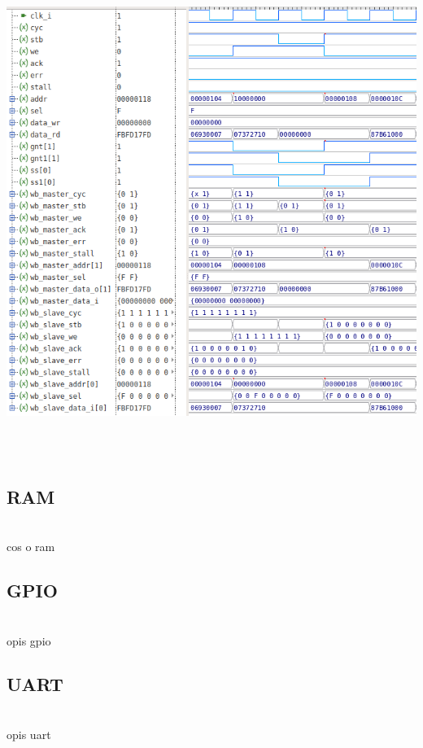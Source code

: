 \documentclass[11pt,a4paper]{article}
\begin{document}
			\begin{minipage}{\textwidth}
				\nopagebreak
				\begin{center}
					\includegraphics[height=16cm,width=14cm,keepaspectratio]{./rysunki/wishbone_timing.png}
				\end{center}
			\end{minipage} 
	\subsection{RAM}
	\hspace{5mm}
		\\cos o ram

	\subsection{GPIO}
	\hspace{5mm}
		\\opis gpio

	\subsection{UART}
	\hspace{5mm}
		\\opis uart
\end{document}
